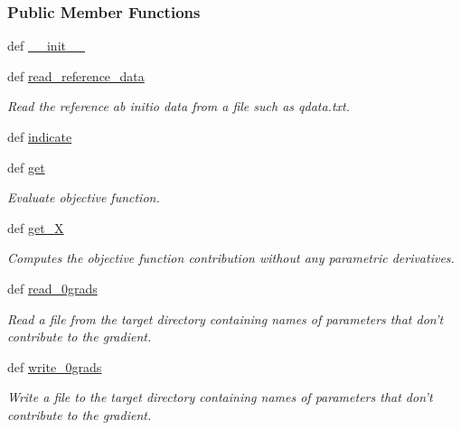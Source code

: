 \subsubsection*{Public Member Functions}
\begin{DoxyCompactItemize}
\item 
def \hyperlink{classforcebalance_1_1tinkerio_1_1Interaction__TINKER_a34afd2802edb7d35200abb09ccf6f8c7}{\-\_\-\-\_\-init\-\_\-\-\_\-}
\item 
def \hyperlink{classforcebalance_1_1interaction_1_1Interaction_aa67c082c3b6fa2d87ba3f4cf1a74e4f8}{read\-\_\-reference\-\_\-data}
\begin{DoxyCompactList}\small\item\em Read the reference ab initio data from a file such as qdata.\-txt. \end{DoxyCompactList}\item 
def \hyperlink{classforcebalance_1_1interaction_1_1Interaction_a91f94b978b73dd886035dcdb96b53cc1}{indicate}
\item 
def \hyperlink{classforcebalance_1_1interaction_1_1Interaction_a9fc3a40eb2852241ea440af719f6cf29}{get}
\begin{DoxyCompactList}\small\item\em Evaluate objective function. \end{DoxyCompactList}\item 
def \hyperlink{classforcebalance_1_1target_1_1Target_a606dd136f195c267c05a2455405e5949}{get\-\_\-\-X}
\begin{DoxyCompactList}\small\item\em Computes the objective function contribution without any parametric derivatives. \end{DoxyCompactList}\item 
def \hyperlink{classforcebalance_1_1target_1_1Target_a09bb0e8350a17974c908a9728b2709bf}{read\-\_\-0grads}
\begin{DoxyCompactList}\small\item\em Read a file from the target directory containing names of parameters that don't contribute to the gradient. \end{DoxyCompactList}\item 
def \hyperlink{classforcebalance_1_1target_1_1Target_acc7601caa4b719bf7e31961c2eb30dd7}{write\-\_\-0grads}
\begin{DoxyCompactList}\small\item\em Write a file to the target directory containing names of parameters that don't contribute to the gradient. \end{DoxyCompactList}\item 

\end{DoxyCompactItemize}
